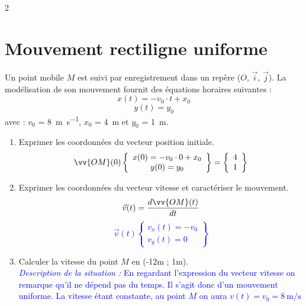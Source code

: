 \documentclass[a4paper,11pt,fleqn]{article}%
\begin{document}
\begin{multicols}{2}
\section{Mouvement rectiligne uniforme}
Un point mobile $M$ est suivi par enregistrement dans un repère ($O$, $\vec{i}$, $\vec{j}$). La modélisation de son mouvement fournit des équations horaires suivantes : $$x(t) = -v_0 \cdot t + x_0$$ $$y(t) = y_0$$ avec : $v_0$ = \SI{8}{\meter\per\second}, $x_0$ = \SI{4}{m} et $y_0$ = \SI{1}{m}.
\begin{enumerate}
	\item Exprimer les coordonnées du vecteur position initiale.\\
\textcolor{blue}{$$ \vv{OM}(0) \left\{
	\begin{array}{c}
		x(0) = -v_0 \cdot 0 + x_0\\
		y(0) =  y_0
	\end{array}
\right\} = \left\{
	\begin{array}{c}
		4\\
		1
	\end{array}
\right\}$$}
	\item Exprimer les coordonnées du vecteur vitesse et caractériser le mouvement.\\
\textcolor{blue}{$$ \vec{v}(t) = \dfrac{d\vv{OM}(t)}{dt}$$
$$ \vec{v}(t) \left\{
	\begin{array}{c}
		v_x(t) = -v_0\\
		v_y(t) = 0
	\end{array}
\right\}$$}
	\item Calculer la vitesse du point $M$ en (-12m ; 1m).\\
\textcolor{blue}{\emph{Description de la situation :} En regardant l'expression du vecteur vitesse on remarque qu'il ne dépend pas du temps. Il s'agit donc d'un mouvement uniforme. La vitesse étant constante, au point $M$ on aura $v(t) = v_0 = \SI{8}{\meter\per\second}$}
\end{enumerate}


\end{multicols}
\end{document}
